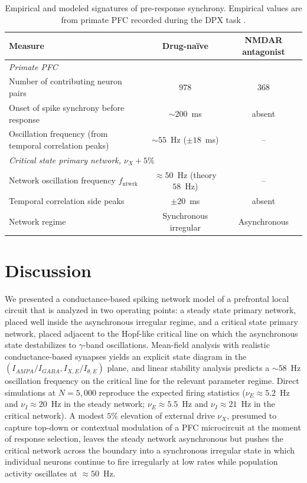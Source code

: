 \documentclass[11pt]{article}
\begin{document}
\begin{table}[ht]
\centering
\caption{Empirical and modeled signatures of pre-response synchrony. Empirical values are from primate PFC recorded during the DPX task \citep{zick2018differential}.}
\label{tab:compare}
\begin{tabular}{lcc}
\toprule
Measure & Drug-na\"ive & NMDAR antagonist \\
\midrule
\multicolumn{3}{l}{\emph{Primate PFC}} \\
Number of contributing neuron pairs & $978$ & $368$ \\
Onset of spike synchrony before response & $\sim 200$~ms & absent \\
Oscillation frequency (from temporal correlation peaks) & $\sim 55$~Hz ($\pm 18$~ms) & -- \\
\midrule
\multicolumn{3}{l}{\emph{Critical state primary network, $\nu_X + 5\%$}} \\
Network oscillation frequency $f_{\mathrm{ntwrk}}$ & $\approx 50$~Hz (theory $58$~Hz) & -- \\
Temporal correlation side peaks & $\pm 20$~ms & absent \\
Network regime & Synchronous irregular & Asynchronous \\
\bottomrule
\end{tabular}
\end{table}

\section{Discussion}

We presented a conductance-based spiking network model of a prefrontal local circuit that is analyzed in two operating points: a steady state primary network, placed well inside the asynchronous irregular regime, and a critical state primary network, placed adjacent to the Hopf-like critical line on which the asynchronous state destabilizes to $\gamma$-band oscillations. Mean-field analysis with realistic conductance-based synapses \citep{amit1997model,brunel2000dynamics,brunel2001effects,renart2003mean} yields an explicit state diagram in the $(I_{AMPA}/I_{GABA}, I_{X,E}/I_{\theta,E})$ plane, and linear stability analysis predicts a $\sim 58$~Hz oscillation frequency on the critical line for the relevant parameter regime. Direct simulations at $N = 5{,}000$ reproduce the expected firing statistics ($\nu_E \approx 5.2$~Hz and $\nu_I \approx 20$~Hz in the steady network; $\nu_E \approx 5.5$~Hz and $\nu_I \approx 21$~Hz in the critical network). A modest $5\%$ elevation of external drive $\nu_X$, presumed to capture top-down or contextual modulation of a PFC microcircuit at the moment of response selection, leaves the steady network asynchronous but pushes the critical network across the boundary into a synchronous irregular state in which individual neurons continue to fire irregularly at low rates while population activity oscillates at $\approx 50$~Hz.
\end{document}
